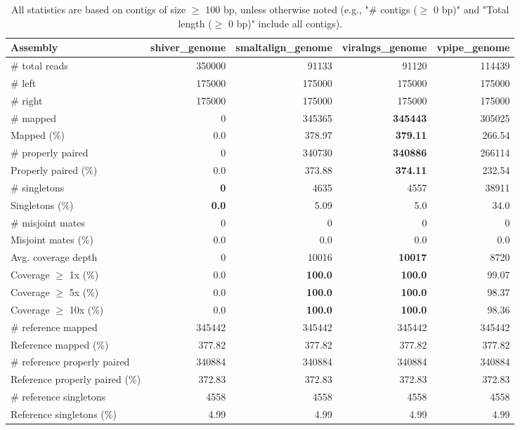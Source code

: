 \documentclass[12pt,a4paper]{article}
\begin{document}
\begin{table}[ht]
\begin{center}
\caption{All statistics are based on contigs of size $\geq$ 100 bp, unless otherwise noted (e.g., "\# contigs ($\geq$ 0 bp)" and "Total length ($\geq$ 0 bp)" include all contigs).}
\begin{tabular}{|l*{4}{|r}|}
\hline
Assembly & shiver\_genome & smaltalign\_genome & viralngs\_genome & vpipe\_genome \\ \hline
\# total reads & 350000 & 91133 & 91120 & 114439 \\ \hline
\# left & 175000 & 175000 & 175000 & 175000 \\ \hline
\# right & 175000 & 175000 & 175000 & 175000 \\ \hline
\# mapped & 0 & 345365 & {\bf 345443} & 305025 \\ \hline
Mapped (\%) & 0.0 & 378.97 & {\bf 379.11} & 266.54 \\ \hline
\# properly paired & 0 & 340730 & {\bf 340886} & 266114 \\ \hline
Properly paired (\%) & 0.0 & 373.88 & {\bf 374.11} & 232.54 \\ \hline
\# singletons & {\bf 0} & 4635 & 4557 & 38911 \\ \hline
Singletons (\%) & {\bf 0.0} & 5.09 & 5.0 & 34.0 \\ \hline
\# misjoint mates & 0 & 0 & 0 & 0 \\ \hline
Misjoint mates (\%) & 0.0 & 0.0 & 0.0 & 0.0 \\ \hline
Avg. coverage depth & 0 & 10016 & {\bf 10017} & 8720 \\ \hline
Coverage $\geq$ 1x (\%) & 0.0 & {\bf 100.0} & {\bf 100.0} & 99.07 \\ \hline
Coverage $\geq$ 5x (\%) & 0.0 & {\bf 100.0} & {\bf 100.0} & 98.37 \\ \hline
Coverage $\geq$ 10x (\%) & 0.0 & {\bf 100.0} & {\bf 100.0} & 98.36 \\ \hline
\# reference mapped & 345442 & 345442 & 345442 & 345442 \\ \hline
Reference mapped (\%) & 377.82 & 377.82 & 377.82 & 377.82 \\ \hline
\# reference properly paired & 340884 & 340884 & 340884 & 340884 \\ \hline
Reference properly paired (\%) & 372.83 & 372.83 & 372.83 & 372.83 \\ \hline
\# reference singletons & 4558 & 4558 & 4558 & 4558 \\ \hline
Reference singletons (\%) & 4.99 & 4.99 & 4.99 & 4.99 \\ \hline

\end{tabular}
\end{center}
\end{table}
\end{document}
